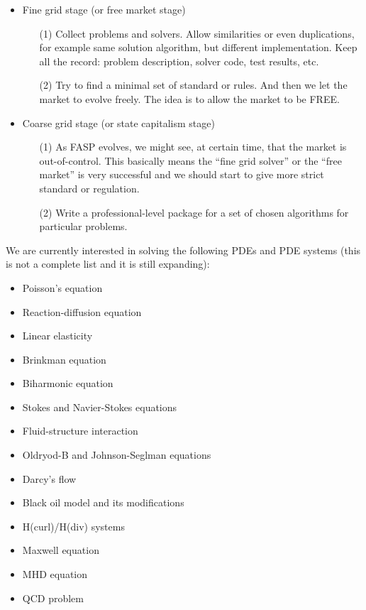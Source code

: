 \documentclass[11pt]{memoir}
\begin{document}
\begin{itemize}

\item Fine grid stage (or free market stage)

\begin{enumerate}
\item[(1)] Collect problems and solvers. Allow similarities or even duplications, for example same solution algorithm, but different implementation. Keep all the record: problem description, solver code, test results, etc. 
%
\item[(2)] Try to find a minimal set of standard or rules. And then we let the market to evolve freely. The idea is to allow the market to be FREE. 
\end{enumerate}

\item Coarse grid stage (or state capitalism stage)

\begin{enumerate}
\item[(1)] As FASP evolves, we might see, at certain time, that the market is out-of-control. This basically means the ``fine grid solver'' or the ``free market'' is very successful and we should start to give more strict standard or regulation.
%
\item[(2)] Write a professional-level package for a set of chosen algorithms for particular problems.
\end{enumerate}
\end{itemize}
%
We are currently interested in solving the following PDEs and PDE systems (this is not a complete list and it is still expanding):
\begin{itemize}
\item Poisson's equation
\item Reaction-diffusion equation
\item Linear elasticity
\item Brinkman equation
\item Biharmonic equation
\item Stokes and Navier-Stokes equations
\item Fluid-structure interaction
\item Oldryod-B and Johnson-Seglman equations
\item Darcy's flow
\item Black oil model and its modifications
\item H(curl)/H(div) systems
\item Maxwell equation
\item MHD equation
\item QCD problem
\end{itemize}
%
\end{document}
